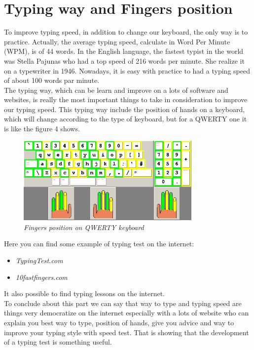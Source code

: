 \documentclass[12pt]{report}%
\begin{document}
\section{Typing way and Fingers position}
To improve typing speed, in addition to change our keyboard, the only way is to practice. Actually, the average typing speed, calculate in Word Per Minute (WPM), is of 44 words.\cite{ref7} In the English language, the fastest typist in the world was Stella Pajunas who had a top speed of 216 words per minute. She realize it on a typewriter in 1946. Nowadays, it is easy with practice to had a typing speed of about 100 words par minute.\\ 
The typing way, which can be learn and improve on a lots of software and websites, is really the most important things to take in consideration to improve our typing speed. This typing way include the position of hands on a keyboard, which will change according to the type of keyboard, but for a QWERTY one it is like the figure 4 shows.
\begin{figure}[H]
\begin{center}
\includegraphics[width=9cm]{images/FingerHandPosUSA.png} 
\end{center}
\caption{\it Fingers position on QWERTY keyboard}
\label{Poulpy est multicolore}
\end{figure}
Here you can find some example of typing test on the internet:
\begin{itemize}
\item\it TypingTest.com\cite{ref8}
\item\it 10fastfingers.com\cite{ref9}
\end{itemize}
It also possible to find typing lessons on the internet.\\
To conclude about this part we can say that way to type and typing speed are things very democratize on the internet especially with a lots of website who can explain you best way to type, position of hands, give you advice and way to improve your typing style with speed test. That is showing that the development of a typing test is something useful.
\end{document}
